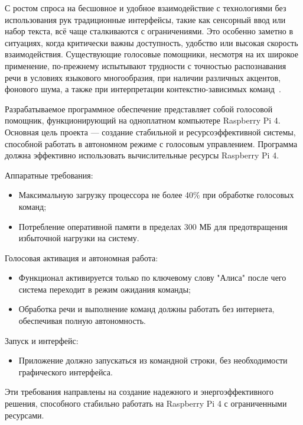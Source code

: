  С ростом спроса на бесшовное и удобное взаимодействие с технологиями без использования рук традиционные интерфейсы, такие как сенсорный ввод или набор текста, всё чаще сталкиваются с ограничениями. Это особенно заметно в ситуациях, когда критически важны доступность, удобство или высокая скорость взаимодействия. Существующие голосовые помощники, несмотря на их широкое применение, по-прежнему испытывают трудности с точностью распознавания речи в условиях языкового многообразия, при наличии различных акцентов, фонового шума, а также при интерпретации контекстно-зависимых команд~\cite{name22}.

Разрабатываемое программное обеспечение представляет собой голосовой помощник, функционирующий на одноплатном компьютере Raspberry Pi 4.
Основная цель проекта — создание стабильной и ресурсоэффективной системы, способной работать в автономном режиме с голосовым управлением.
Программа должна эффективно использовать вычислительные ресурсы Raspberry Pi 4.

Аппаратные требования:
\begin{itemize}
	\item Максимальную загрузку процессора не более 40\% при обработке голосовых команд;
	\item Потребление оперативной памяти в пределах 300 МБ для предотвращения избыточной нагрузки на систему.
\end{itemize}

Голосовая активация и автономная работа:
\begin{itemize}
	\item Функционал активируется только по ключевому слову "Алиса" после чего система переходит в режим ожидания команды;
	\item Обработка речи и выполнение команд должны работать без интернета, обеспечивая полную автономность.
\end{itemize}

Запуск и интерфейс:
\begin{itemize}
	\item Приложение должно запускаться из командной строки, без необходимости графического интерфейса.
\end{itemize}

Эти требования направлены на создание надежного и энергоэффективного решения, способного стабильно работать на Raspberry Pi 4 с ограниченными ресурсами.
\newpage
